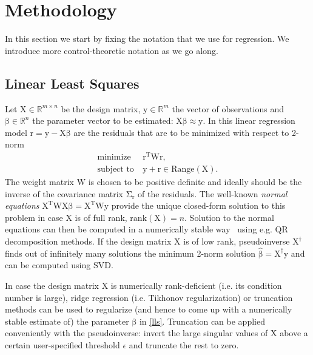 \documentclass[10pt,a4paper]{article}
\theoremstyle{plain}
\theoremstyle{definition}
\newcommand{\boldvec}[1]{\boldsymbol{\mathrm{#1}}}
\let\vec\boldvec
\newcommand{\designMat}{\vec{X}} %
\newcommand{\observations}{\vec{y}} %
\newcommand{\param}{\vec{\beta}} %
\newcommand{\residual}{\vec{r}} %
\newcommand{\weightingMat}{\vec{W}} %
\newcommand{\covarRes}{\vec{\Sigma}_{\residual}} %
\newcommand{\threshold}{\epsilon}
\begin{document}
\section{Methodology}\label{methodology}

In this section we start by fixing the notation that we use for regression. We introduce more control-theoretic notation as we go along.
%
\subsection{Linear Least Squares}
Let $\designMat \in \mathbb{R}^{m \times n}$ be the design matrix, $\observations \in \mathbb{R}^{m}$ the vector of observations and  $\param \in \mathbb{R}^{n}$ the parameter vector to be estimated: $\designMat\param \approx \observations$. In this linear regression model $\residual = \observations - \designMat\param$ are the residuals that are to be minimized with respect to 2-norm~\cite{Golub80}
%
\begin{equation}
\begin{aligned}
\text{minimize} &\ \residual^{\mathrm{T}}\weightingMat\residual, \\
\text{subject to} &\ \observations + \residual \in \text{Range}(\designMat).
\end{aligned}
\label{lls}
\end{equation}
%
\noindent The weight matrix $\weightingMat$ is chosen to be positive definite and ideally should be the inverse of the covariance matrix $\covarRes$ of the residuals. The well-known \emph{normal equations} $\designMat^{\mathrm{T}}\weightingMat\designMat \param = \designMat^{\mathrm{T}} \weightingMat\observations$ provide the unique closed-form solution to this problem in case $\designMat$ is of full rank, $\text{rank}(\designMat) = n$. Solution to the normal equations can then be computed in a numerically stable way~\cite{Golub96} using e.g. QR decomposition methods. If the design matrix $\designMat$ is of low rank, pseudoinverse $\designMat^{\dagger}$ finds out of infinitely many solutions the minimum 2-norm solution $\hat{\param} = \designMat^{\dagger}\observations$ and can be computed using SVD. %

In case the design matrix $\designMat$ is numerically rank-deficient (i.e. its condition number is large), ridge regression (i.e. Tikhonov regularization) or truncation methods can be used to regularize (and hence to come up with a numerically stable estimate of) the parameter $\param$ in \eqref{lls}. Truncation can be applied conveniently with the pseudoinverse: invert the large singular values of $\designMat$ above a certain user-specified threshold $\threshold$ and truncate the rest to zero.
\end{document}
